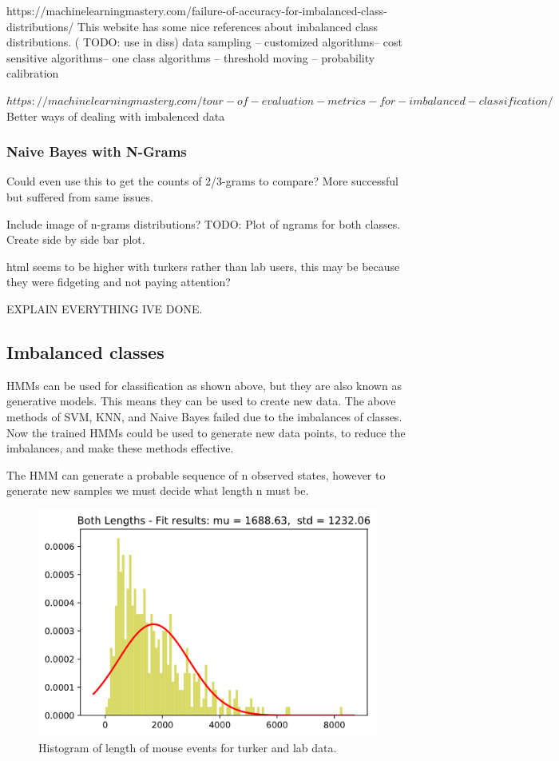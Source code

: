 \documentclass{article}
\begin{document}
https://machinelearningmastery.com/failure-of-accuracy-for-imbalanced-class-distributions/
This website has some nice references about imbalanced class distributions.
( TODO: use in diss)
data sampling – customized algorithms– cost sensitive algorithms– one class algorithms – threshold moving – probability calibration


$https://machinelearningmastery.com/tour-of-evaluation-metrics-for-imbalanced-classification/$
Better ways of dealing with imbalenced data

\subsubsection{Naive Bayes with N-Grams}
Could even use this to get the counts of 2/3-grams to compare?
More successful but suffered from same issues.

Include image of n-grams distributions?
TODO: Plot of ngrams for both classes. Create side by side bar plot.

html seems to be higher with turkers rather than lab users, this may be because they were fidgeting and not paying attention?

EXPLAIN EVERYTHING IVE DONE.

\subsection{Imbalanced classes}

HMMs can be used for classification as shown above, but they are also known as generative models.
This means they can be used to create new data.
The above methods of SVM, KNN, and Naive Bayes failed due to the imbalances of classes.
Now the trained HMMs could be used to generate new data points, to reduce the imbalances, and make these methods effective.

The HMM can generate a probable sequence of n observed states, however to generate new samples we must decide what length n must be.


\begin{figure}[ht]
    \centering
    \includegraphics[scale=0.5]{Images/Lengths-Histogram.png}
    \caption{Histogram of length of mouse events for turker and lab data.}
    \label{fig:normaldis}
\end{figure}
\end{document}
